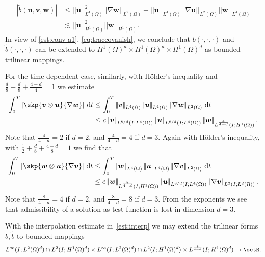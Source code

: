 \documentclass[reqno,a4paper]{amsart}
\def\abs#1{\left| #1 \right|}
\def\norm#1{\left|\!\left| #1 \right|\!\right|}
\def\vec#1{\boldsymbol{#1}}
\def\d{{\rm d}}
\def\dt{\,\d t}
\def\bu{\vec{u}}
\def\bv{\vec{v}}
\def\bw{\vec{w}}
\begin{document}
\begin{equation}
	\begin{aligned}\label{eq:traccovanish}
		|\widetilde{b}(\bu,\bv,\bw)| &\leq
		\norm{\bu}_{L^4(\Omega)}^2 \norm{\nabla \bw}_{L^2(\Omega)} + \norm{\bu}_{L^4(\Omega)} \norm{\nabla \bu}_{L^2(\Omega)} \norm{\bw}_{L^4(\Omega)}
		\\
		&
		\lesssim  \norm{\bu}_{H^1(\Omega)}^2 \norm{ \bw}_{H^1(\Omega)}.
	\end{aligned}
\end{equation}
In view of \eqref{est:conv-a1}, \eqref{eq:traccovanish}, we conclude that $b(\cdot,\cdot,\cdot)$ and $\widetilde b(\cdot,\cdot,\cdot)$ can be extended to $H^1(\Omega)^d \times H^1(\Omega)^d \times H^1(\Omega)^d$ as bounded trilinear mappings. 

For the time-dependent case, similarly, with Hölder's inequality and $\frac{d}{8} + \frac{d}{8} + \frac{4-d}{4}  = 1$ we estimate 
\begin{equation}
	\begin{aligned}\label{est:conv-t-a1}
		\int_0^T \abs{\skp{\bv\otimes \bu}{\nabla\bw}}  \dt 
		&\leq 
		\int_0^T \norm{\bv}_{L^4(\Omega)} \norm{\bu}_{L^4(\Omega)} \norm{\nabla \bw}_{L^2(\Omega)} \dt\\
		&\leq 
		c \norm{\bv}_{L^{8/d}(I;L^4(\Omega))}
		\norm{\bu}_{L^{8/d}(I;L^4(\Omega))}  \norm{\bw}_{L^{\frac{4}{4-d}}(I;H^1(\Omega))}.
	\end{aligned}
\end{equation}
Note that $\frac{4}{4-d} = 2$ if $d = 2$, and $\frac{4}{4-d} = 4$ if $d = 3$. 
Again with Hölder's inequality, with 
$\frac{1}{2} + \frac{d}{8} + \frac{4-d}{8}  = 1$ we find that
\begin{equation}
	\begin{aligned}\label{est:conv-t-a2}
		\int_0^T \abs{\skp{\bw\otimes \bu}{\nabla\bv}}  \dt 
		&\leq \int_0^T \norm{\bw}_{L^4(\Omega)} \norm{\bu}_{L^4(\Omega)} \norm{\nabla \bv}_{L^2(\Omega)} \dt\\
		&\leq 
		c\norm{\bw}_{L^{\frac{8}{4-d}}(I;H^1(\Omega))} 
		\norm{\bu}_{L^{8/d}(I;L^4(\Omega))}
		\norm{\nabla \bv}_{L^{2}(I;L^2(\Omega))}.
	\end{aligned}
\end{equation}
Note that $\frac{8}{4-d} = 4$ if $d = 2$, and $\frac{8}{4-d} = 8$ if $d = 3$. 
From the exponents we see that admissibility of 
a solution as test function 
is lost in dimension $d = 3$. 

With the interpolation estimate in~\eqref{est:interp} we may extend the trilinear forms $b,\widetilde{b}$ to bounded mappings 
\begin{align*}
	L^\infty(I;L^2(\Omega)^d) \cap L^2(I;H^1(\Omega)^d) \times L^\infty(I;L^2(\Omega)^d) \cap L^2(I;H^1(\Omega)^d) \times L^\frac{8}{4-d	}(I;H^1(\Omega)^d) \to \setR.
\end{align*}
\end{document}

